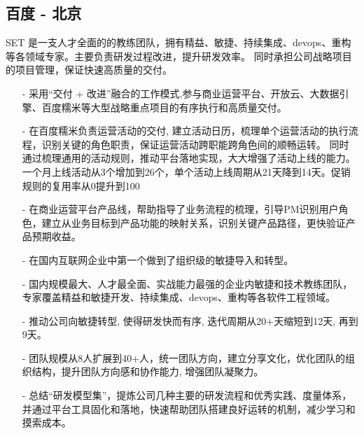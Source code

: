 \documentclass[11pt,a4paper]{moderncv}
\begin{document}
\subsection{百度 - 北京}  
\vspace{1ex}  
{
  SET 是一支人才全面的的教练团队，拥有精益、敏捷、持续集成、devops、重构等各领域专家。主要负责研发过程改进，提升研发效率。
  同时承担公司战略项目的项目管理，保证快速高质量的交付。
\vspace{1ex}
  \begin{itemize}
    \item[-] 采用“交付 + 改进”融合的工作模式,参与商业运营平台、开放云、大数据引擎、百度糯米等大型战略重点项目的有序执行和高质量交付。
\vspace{1ex}  
    \item[-] 在百度糯米负责运营活动的交付, 建立活动日历，梳理单个运营活动的执行流程，识别关键的角色职责，保证运营活动跨职能跨角色间的顺畅运转。 同时通过梳理通用的活动规则，推动平台落地实现，大大增强了活动上线的能力。一个月上线活动从3个增加到26个，单个活动上线周期从21天降到14天。促销规则的复用率从0提升到100%
\vspace{1ex}  
    \item[-] 在商业运营平台产品线，帮助指导了业务流程的梳理，引导PM识别用户角色，建立从业务目标到产品功能的映射关系，识别关键产品路径，更快验证产品预期收益。
\vspace{1ex}  
    \item[-] 在国内互联网企业中第一个做到了组织级的敏捷导入和转型。
\vspace{1ex}  
    \item[-] 国内规模最大、人才最全面、实战能力最强的企业内敏捷和技术教练团队，专家覆盖精益和敏捷开发、持续集成、devops、重构等各软件工程领域。
\vspace{1ex}  
    \item[-] 推动公司向敏捷转型, 使得研发快而有序, 迭代周期从20+天缩短到12天, 再到9天。
\vspace{1ex}  
    \item[-] 团队规模从8人扩展到40+人，统一团队方向，建立分享文化，优化团队的组织结构，提升团队方向感和协作能力, 增强团队凝聚力。 
\vspace{1ex}  
    \item[-] 总结“研发模型集”，提炼公司几种主要的研发流程和优秀实践、度量体系，并通过平台工具固化和落地，快速帮助团队搭建良好运转的机制，减少学习和摸索成本。
  \end{itemize}
}
\end{document}
